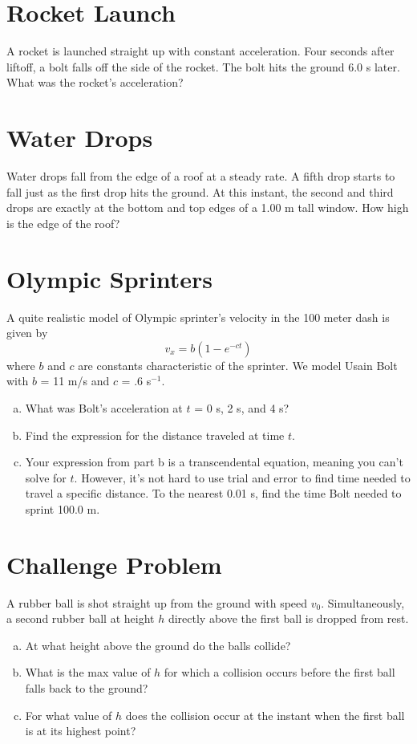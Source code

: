 \documentclass[12pt]{article}
\begin{document}
\section{Rocket Launch}

A rocket is launched straight up with constant acceleration. Four seconds after liftoff, a bolt falls off the side of the rocket. The bolt hits the ground 6.0 s later. 
What was the rocket's acceleration?

\section{Water Drops}

Water drops fall from the edge of a roof at a steady rate. A fifth drop starts to fall just as the first drop hits the ground. At this instant, the second and third drops are exactly at the bottom and top edges of a 1.00 m tall window. How high is the edge of the roof?


\section{Olympic Sprinters}

A quite realistic model of Olympic sprinter's velocity in the 100 meter dash is given by 
$$ v_x = b(1-e^{-ct}) $$
where $b$ and $c$ are constants characteristic of the sprinter. We model Usain Bolt with $b$ = 11 m/s and $c$ = .6 s$^{-1}$.

\begin{enumerate}[(a)]
	\item What was Bolt's acceleration at $t$ = 0 s, 2 s, and 4 s?
	\vspace{-1mm}
	\item Find the expression for the distance traveled at time $t$.
	\vspace{-1mm}
	\item Your expression from part b is a transcendental equation, meaning you can't solve for $t$. However, it's not hard to use trial and error to find time needed to travel a specific distance. To the nearest 0.01 s, find the time Bolt needed to sprint 100.0 m. 
\end{enumerate}


\section{Challenge Problem}

A rubber ball is shot straight up from the ground with speed $v_0$. Simultaneously, a second rubber ball at height $h$ directly above the first ball is dropped from rest. 

\begin{enumerate}[(a)]
	\item At what height above the ground do the balls collide?
	\vspace{-1mm}
	\item What is the max value of $h$ for which a collision occurs before the first ball falls back to the ground?
	\vspace{-1mm}
	\item For what value of $h$ does the collision occur at the instant when the first ball is at its highest point? 
\end{enumerate}
\end{document}
